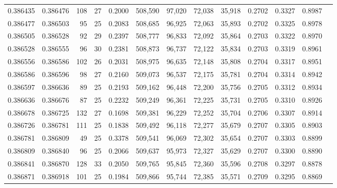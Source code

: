 \begin{tabular}{rrrrrrrrrrrrr}
0.386435 & 0.386476 &   108 &  27 &                                     0.2000 & 508,590 &  97,020 &  72,038 &  35,918 & 0.2702 & 0.3327 & 0.8987 \\
0.386477 & 0.386503 &    95 &  25 &                                     0.2083 & 508,685 &  96,925 &  72,063 &  35,893 & 0.2702 & 0.3325 & 0.8978 \\
0.386505 & 0.386528 &    92 &  29 &                                     0.2397 & 508,777 &  96,833 &  72,092 &  35,864 & 0.2703 & 0.3322 & 0.8970 \\
0.386528 & 0.386555 &    96 &  30 &                                     0.2381 & 508,873 &  96,737 &  72,122 &  35,834 & 0.2703 & 0.3319 & 0.8961 \\
0.386556 & 0.386586 &   102 &  26 &                                     0.2031 & 508,975 &  96,635 &  72,148 &  35,808 & 0.2704 & 0.3317 & 0.8951 \\
0.386586 & 0.386596 &    98 &  27 &                                     0.2160 & 509,073 &  96,537 &  72,175 &  35,781 & 0.2704 & 0.3314 & 0.8942 \\
0.386597 & 0.386636 &    89 &  25 &                                     0.2193 & 509,162 &  96,448 &  72,200 &  35,756 & 0.2705 & 0.3312 & 0.8934 \\
0.386636 & 0.386676 &    87 &  25 &                                     0.2232 & 509,249 &  96,361 &  72,225 &  35,731 & 0.2705 & 0.3310 & 0.8926 \\
0.386678 & 0.386725 &   132 &  27 &                                     0.1698 & 509,381 &  96,229 &  72,252 &  35,704 & 0.2706 & 0.3307 & 0.8914 \\
0.386726 & 0.386781 &   111 &  25 &                                     0.1838 & 509,492 &  96,118 &  72,277 &  35,679 & 0.2707 & 0.3305 & 0.8903 \\
0.386781 & 0.386809 &    49 &  25 &                                     0.3378 & 509,541 &  96,069 &  72,302 &  35,654 & 0.2707 & 0.3303 & 0.8899 \\
0.386809 & 0.386840 &    96 &  25 &                                     0.2066 & 509,637 &  95,973 &  72,327 &  35,629 & 0.2707 & 0.3300 & 0.8890 \\
0.386841 & 0.386870 &   128 &  33 &                                     0.2050 & 509,765 &  95,845 &  72,360 &  35,596 & 0.2708 & 0.3297 & 0.8878 \\
0.386871 & 0.386918 &   101 &  25 &                                     0.1984 & 509,866 &  95,744 &  72,385 &  35,571 & 0.2709 & 0.3295 & 0.8869 \\

\end{tabular}
